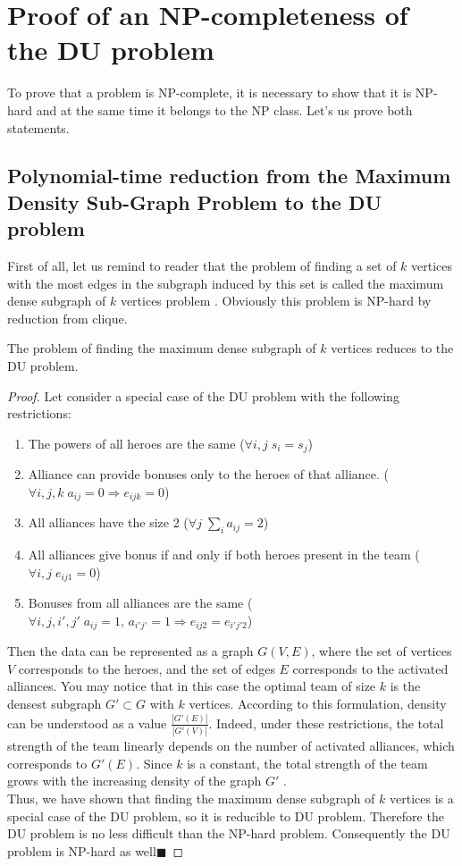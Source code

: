 \documentclass[smallextended]{svjour3}       %
\begin{document}
\section{Proof of an NP-completeness of the DU problem}
\label{SectionNPCompleteProof}
To prove that a problem is NP-complete, it is necessary to show that it is NP-hard  and at the same time it belongs to the NP class. Let's us prove both statements.
\subsection{Polynomial-time reduction from the Maximum Density Sub-Graph Problem to the DU problem}
First of all, let us remind to reader that the problem of finding a set of $k$ vertices with the most edges in the subgraph induced by this set is called the maximum dense subgraph of $k$ vertices problem \cite{kortsarz1993choosing}. Obviously this problem is NP-hard by reduction from clique.
\begin{theorem}
\label{MEWC_DU}
The problem of finding the maximum dense subgraph of $k$ vertices reduces to the DU problem.
\end{theorem}
\begin{proof}
Let consider a special case of the DU problem with the following restrictions:
\begin{enumerate}
    \item The powers of all heroes are the same ($\forall i, j \; s_i=s_j$)
    \item Alliance can provide bonuses only to the heroes of that alliance. ($\forall i, j, k \; a_{ij}=0 \Longrightarrow e_{ijk} = 0$)
    \item All alliances have the size 2 ($\forall j \; \sum_i a_{ij}=2 $)
    \item All alliances give bonus if and only if both heroes present in the team ($\forall i, j \; e_{ij1}=0$)
    \item Bonuses from all alliances are the same ($\forall i, j, i', j' \; a_{ij}=1,\, a_{i' j'}=1 \Longrightarrow e_{ij2}=e_{i' j' 2}$)
\end{enumerate}
Then the data can be represented as a graph $ G(V, E) $, where the set of vertices $ V $ corresponds to the heroes, and the set of edges $E$ corresponds to the activated alliances. You may notice that in this case the optimal team of size $ k $ is the densest subgraph $ G' \subset G $ with $ k $ vertices.  According to this formulation, density can be understood as a value $ \frac{|G'(E)|}{|G'(V)|} $. Indeed, under these restrictions, the total strength of the team linearly depends on the number of activated alliances, which corresponds to $ G'(E)$. Since $ k $ is a constant, the total strength of the team grows with the increasing density of the graph $ G '$ .\\
Thus, we have shown that finding the maximum dense subgraph of $k$ vertices is a special case of the DU problem, so it is reducible to DU problem. Therefore the DU problem is no less difficult than the NP-hard  problem. Consequently the DU problem is NP-hard as well$\blacksquare$
\end{proof}
\end{document}
